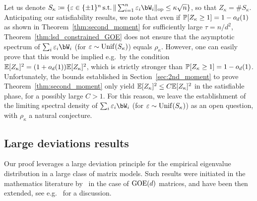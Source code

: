 \myskip
Let us denote
$S_\kappa \coloneqq \{\eps \in \{\pm 1\}^n \, \textrm{s.t.} \, \|\sum_{i=1}^n \eps_i \bW_i\|_{\op} \leq \kappa \sqrt{n} \}$,
so that $Z_\kappa = \# S_\kappa$.
Anticipating our satisfiability results, we note that even if $\mathbb{P}[Z_\kappa \geq 1] = 1 - o_d(1)$ as shown in Theorem~\ref{thm:second_moment} for sufficiently large $\tau = n/d^2$, Theorem~\ref{thm:lsd_constrained_GOE} does not ensure that the asymptotic spectrum of $\sum_i \eps_i \bW_i$ (for $\varepsilon \sim \mathrm{Unif}(S_\kappa)$) equals $\rho_\kappa$.
However, one can easily prove that this would be implied e.g.\ by the condition $\mathbb{E}[Z_\kappa]^2 = (1+o_d(1)) \mathbb{E}[Z_\kappa]^2$, which is strictly stronger than $\mathbb{P}[Z_\kappa \geq 1] = 1 - o_d(1)$.
Unfortunately, the bounds established in Section~\ref{sec:2nd_moment} to prove Theorem~\ref{thm:second_moment} only yield $\mathbb{E}[Z_\kappa]^2 \leq C \mathbb{E}[Z_\kappa]^2$ in the satisfiable phase, for a possibly large $C > 1$.
For this reason, we leave the establishment of the limiting spectral density of $\sum_i \eps_i \bW_i$ (for $\varepsilon \sim \mathrm{Unif}(S_\kappa)$) as an open question, 
with $\rho_\kappa$ a natural conjecture.

\subsection{Large deviations results}

Our proof leverages a large deviation principle for the empirical eigenvalue distribution in a large class of matrix models.
Such results were initiated in the mathematics literature by~\cite{arous1997large} in the case of $\mathrm{GOE}(d)$ matrices, and have been then extended, see e.g.~\cite{guionnet2022rare} for a discussion.

